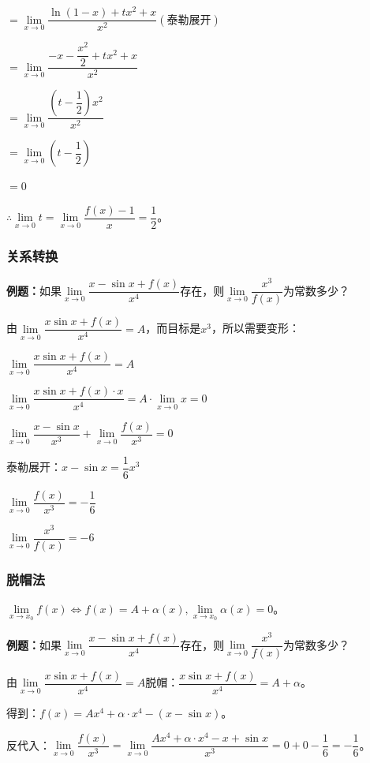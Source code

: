 $=\lim\limits_{x\to 0}\dfrac{\ln(1-x)+tx^2+x}{x^2} (\text{泰勒展开})$\medskip

$=\lim\limits_{x\to 0}\dfrac{-x-\dfrac{x^2}{2}+tx^2+x}{x^2}$\medskip

$=\lim\limits_{x\to 0}\dfrac{\left(t-\dfrac{1}{2}\right)x^2}{x^2}$\medskip

$=\lim\limits_{x\to 0}\left(t-\dfrac{1}{2}\right)$

$=0$

$\therefore\lim\limits_{x\to 0}t=\lim\limits_{x\to 0}\dfrac{f(x)-1}{x}=\dfrac{1}{2}$。

\subsubsection{关系转换}

\textbf{例题：}如果$\lim\limits_{x\to 0}\dfrac{x-\sin x+f(x)}{x^4}$存在，则$\lim\limits_{x\to 0}\dfrac{x^3}{f(x)}$为常数多少？

由$\lim\limits_{x\to 0}\dfrac{x\sin x+f(x)}{x^4}=A$，而目标是$x^3$，所以需要变形：

$\lim\limits_{x\to 0}\dfrac{x\sin x+f(x)}{x^4}=A$

$\lim\limits_{x\to 0}\dfrac{x\sin x+f(x)\cdot x}{x^4}=A\cdot\lim\limits_{x\to 0}x=0$

$\lim\limits_{x\to 0}\dfrac{x-\sin x}{x^3}+\lim\limits_{x\to 0}\dfrac{f(x)}{x^3}=0$

$\text{泰勒展开：}x-\sin x=\dfrac{1}{6}x^3$

$\lim\limits_{x\to 0}\dfrac{f(x)}{x^3}=-\dfrac{1}{6}$

$\lim\limits_{x\to 0}\dfrac{x^3}{f(x)}=-6$

\subsubsection{脱帽法}

$\lim\limits_{x\to x_0}f(x)\Leftrightarrow f(x)=A+\alpha(x),\lim\limits_{x\to x_0}\alpha(x)=0$。

\textbf{例题：}如果$\lim\limits_{x\to 0}\dfrac{x-\sin x+f(x)}{x^4}$存在，则$\lim\limits_{x\to 0}\dfrac{x^3}{f(x)}$为常数多少？

由$\lim\limits_{x\to 0}\dfrac{x\sin x+f(x)}{x^4}=A$脱帽：$\dfrac{x\sin x+f(x)}{x^4}=A+\alpha$。

得到：$f(x)=Ax^4+\alpha\cdot x^4-(x-\sin x)$。

反代入：$\lim\limits_{x\to 0}\dfrac{f(x)}{x^3}=\lim\limits_{x\to 0}\dfrac{Ax^4+\alpha\cdot x^4-x+\sin x}{x^3}=0+0-\dfrac{1}{6}=-\dfrac{1}{6}$。

